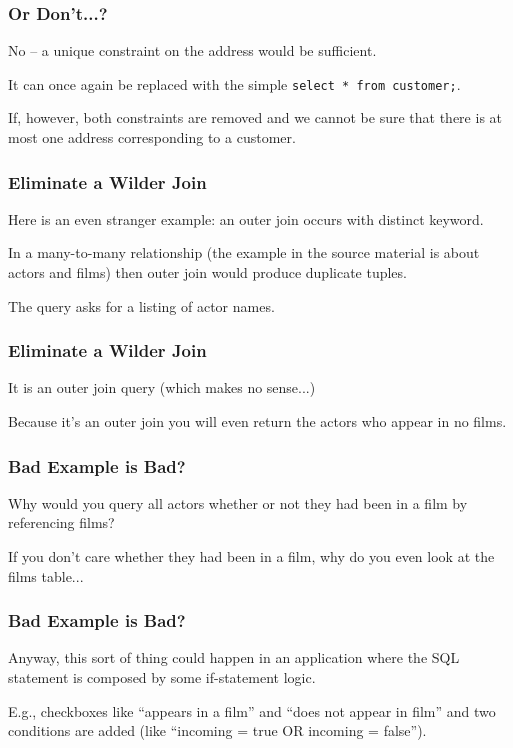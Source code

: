 \begin{frame}
\frametitle{Or Don't...?}

 No -- a unique constraint on the address would be sufficient. 

It can once again be replaced with the simple \texttt{select * from customer;}.

If, however, both constraints are removed and we cannot be sure that there is at most one address corresponding to a customer.


\end{frame}

\begin{frame}
\frametitle{Eliminate a Wilder Join}

Here is an even stranger example:   an outer join occurs with distinct keyword.

In a many-to-many relationship (the example in the source material is about actors and films) then outer join would produce duplicate tuples. 

The query asks for a listing of actor names. 

\end{frame}

\begin{frame}
\frametitle{Eliminate a Wilder Join}
It is an outer join query (which makes no sense...) 

Because it's an outer join you will even return the actors who appear in no films.

\end{frame}


\begin{frame}
\frametitle{Bad Example is Bad?}

Why would you query all actors whether or not they had been in a film by referencing films? 

If you don't care whether they had been in a film, why do you even look at the films table...

\end{frame}


\begin{frame}
\frametitle{Bad Example is Bad?}
Anyway, this sort of thing could happen in an application where the SQL statement is composed by some if-statement logic.

E.g., checkboxes like ``appears in a film'' and ``does not appear in film'' and two conditions are added (like ``incoming = true OR incoming = false'').

\end{frame}

